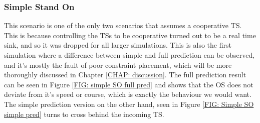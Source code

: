 \subsubsection{Simple Stand On}
This scenario is one of the only two scenarios that assumes a cooperative TS. This is because controlling the TSs to be cooperative
turned out to be a real time sink, and so it was dropped for all larger simulations. 
This is also the first simulation where a difference between simple and full
prediction can be observed, and it's mostly the fault of poor constraint placement, which will be more thoroughly 
discussed in Chapter \ref{CHAP: discussion}. The full prediction result can be seen in
Figure \ref{FIG: simple SO full pred} and shows that the OS does not deviate from it's speed or course, which is exactly the behaviour we would want. 
The simple prediction version on the other hand, seen in Figure \ref{FIG: Simple SO simple pred} turns to cross behind the incoming TS.

